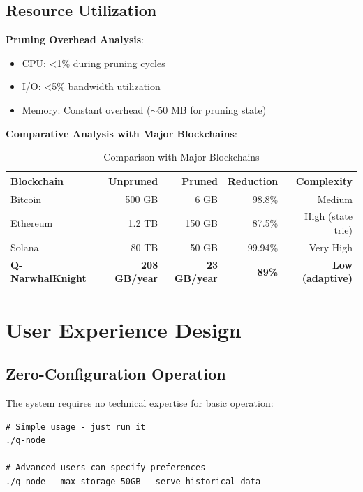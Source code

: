 \documentclass[11pt,a4paper]{article}
\begin{document}
\subsection{Resource Utilization}

\textbf{Pruning Overhead Analysis}:

\begin{itemize}
\item CPU: <1\% during pruning cycles
\item I/O: <5\% bandwidth utilization
\item Memory: Constant overhead ($\sim$50 MB for pruning state)
\end{itemize}

\textbf{Comparative Analysis with Major Blockchains}:

\begin{table}[h]
\centering
\small
\begin{tabular}{lrrrr}
\toprule
\textbf{Blockchain} & \textbf{Unpruned} & \textbf{Pruned} & \textbf{Reduction} & \textbf{Complexity} \\
\midrule
Bitcoin & 500 GB & 6 GB & 98.8\% & Medium \\
Ethereum & 1.2 TB & 150 GB & 87.5\% & High (state trie) \\
Solana & 80 TB & 50 GB & 99.94\% & Very High \\
\textbf{Q-NarwhalKnight} & \textbf{208 GB/year} & \textbf{23 GB/year} & \textbf{89\%} & \textbf{Low (adaptive)} \\
\bottomrule
\end{tabular}
\caption{Comparison with Major Blockchains}
\end{table}

\section{User Experience Design}

\subsection{Zero-Configuration Operation}

The system requires no technical expertise for basic operation:

\begin{verbatim}
# Simple usage - just run it
./q-node

# Advanced users can specify preferences
./q-node --max-storage 50GB --serve-historical-data
\end{verbatim}
\end{document}
